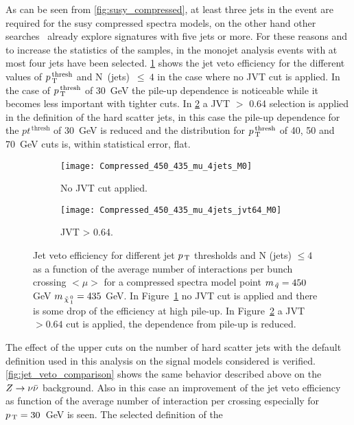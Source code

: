 As can be seen from \cref{fig:susy_compressed}, at least three jets in the event
are required for the \gls{susy} compressed spectra models, on the other hand
other searches~\cite{MultijetSUSY} already explore signatures with five jets or
more. For these reasons and to increase the statistics of the samples, in the
monojet analysis events with at most four jets have been
selected. \cref{fig:comp_4jets_nojvt} shows the jet veto efficiency for the
different values of $p_\mathrm{\, T}^{\mathrm{\, thresh}}$ and N~(jets)~$\leq~4$ in the case
where no JVT cut is applied. In the case of $p_\mathrm{\, T}^{\mathrm{\, thresh}}$ of 30~GeV
the pile-up dependence is noticeable while it becomes less important with
tighter cuts. In \cref{fig:comp_4jets_jvt64} a JVT $>$ 0.64 selection is applied
in the definition of the hard scatter jets, in this case the pile-up dependence
for the $pt^{\mathrm{\, thresh}}$ of 30~GeV is reduced and the distribution for
$p_\mathrm{\, T}^{\mathrm{\, thresh}}$ of 40, 50 and 70~GeV cuts is, within statistical
error, flat.
\begin{figure}[!h]
  \centering
  \begin{subfigure}[t]{.48\linewidth}
    \texttt{[image: Compressed\_450\_435\_mu\_4jets\_M0]}
    \caption{No JVT cut applied.}
    \label{fig:comp_4jets_nojvt}
  \end{subfigure}
  \begin{subfigure}[t]{.48\linewidth}
    \texttt{[image: Compressed\_450\_435\_mu\_4jets\_jvt64\_M0]}
    \caption{JVT > 0.64.}
    \label{fig:comp_4jets_jvt64}
  \end{subfigure}
  \caption{Jet veto efficiency for different jet $p_\mathrm{\, T}$ thresholds and N (jets)
    $\leq 4$ as a function of the average number of interactions per bunch
    crossing $<\mu>$ for a compressed spectra model point $m_{\, \tilde{q}} = 450$ GeV
    $m_{\, \tilde{\chi}_{\, 1}^{\, 0}} = 435$ GeV. In Figure~\ref{fig:comp_4jets_nojvt} no JVT cut is
    applied and there is some drop of the efficiency at high pile-up. In
    Figure~\ref{fig:comp_4jets_jvt64} a JVT $> 0.64$ cut is applied, the
    dependence from pile-up is reduced.}
  \label{fig:comp_eff}
\end{figure}
The effect of the upper cuts on the number of hard scatter jets with the default
definition used in this analysis on the signal models considered is
verified. \cref{fig:jet_veto_comparison} shows the same behavior described above
on the $Z \rightarrow \nu \bar{\nu}$ background. Also in this case an improvement of the jet veto
efficiency as function of the average number of interaction per crossing
especially for $p_\mathrm{\, T} = 30$~GeV is seen. The selected definition of the
